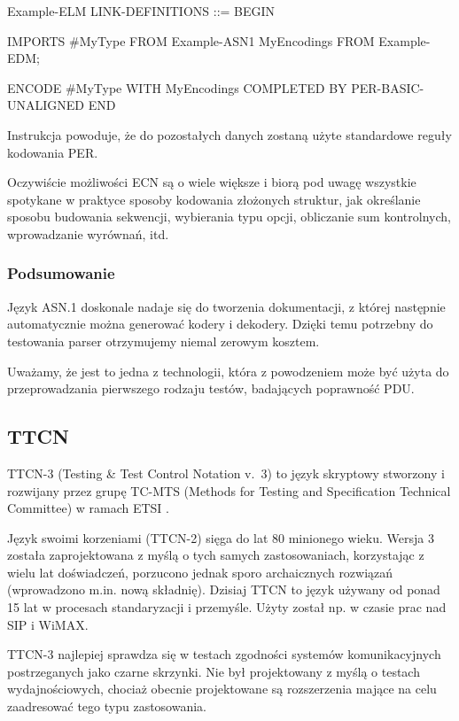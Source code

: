 \documentclass[00-praca-magisterska.tex]{subfiles}
\begin{document}
\begin{textcode}
  Example-ELM LINK-DEFINITIONS ::=
  BEGIN
  
  IMPORTS
    #MyType
  FROM Example-ASN1
    MyEncodings
  FROM Example-EDM;
  
  ENCODE #MyType
    WITH          MyEncodings
    COMPLETED BY  PER-BASIC-UNALIGNED
  END
\end{textcode}

Instrukcja  powoduje, że do pozostałych danych zostaną użyte
standardowe reguły kodowania PER.

Oczywiście możliwości ECN są o wiele większe i biorą pod uwagę wszystkie
spotykane w praktyce sposoby kodowania złożonych struktur, jak określanie
sposobu budowania sekwencji, wybierania typu opcji, obliczanie sum kontrolnych,
wprowadzanie wyrównań, itd.

\subsubsection{Podsumowanie}

Język ASN.1 doskonale nadaje się do tworzenia dokumentacji, z której następnie
automatycznie można generować kodery i dekodery. Dzięki temu potrzebny do
testowania parser otrzymujemy niemal zerowym kosztem.

Uważamy, że jest to jedna z technologii, która z powodzeniem może być użyta do
przeprowadzania pierwszego rodzaju testów, badających poprawność PDU.

\subsection{TTCN}
\label{ttcn}

TTCN-3 (Testing \& Test Control Notation v.~3) to język skryptowy stworzony i
rozwijany przez grupę TC-MTS (Methods for Testing and Specification Technical
Committee) w ramach ETSI \cite{ttcn-main}.

Język swoimi korzeniami (TTCN-2) sięga do lat 80 minionego wieku. Wersja 3
została zaprojektowana z myślą o tych samych zastosowaniach, korzystając z wielu
lat doświadczeń, porzucono jednak sporo archaicznych rozwiązań (wprowadzono
m.in. nową składnię). Dzisiaj TTCN to język używany od ponad 15 lat w procesach
standaryzacji i przemyśle. Użyty został np. w czasie prac nad SIP i WiMAX.

TTCN-3 najlepiej sprawdza się w testach zgodności systemów komunikacyjnych
postrzeganych jako czarne skrzynki. Nie był projektowany z myślą o testach
wydajnościowych, chociaż obecnie projektowane są rozszerzenia mające na celu
zaadresować tego typu zastosowania.
\end{document}
